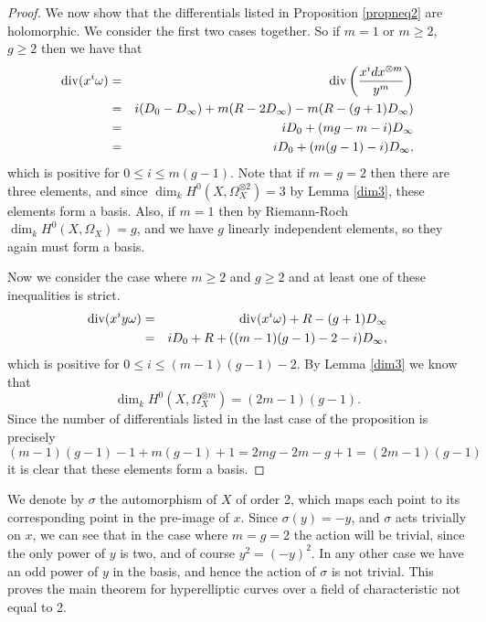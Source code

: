 \begin{proof}
We now show that the differentials listed in Proposition \ref{propneq2} are holomorphic.
We consider the first two cases together.
So if $m=1$ or $m\geq 2$, $g\geq 2$ then we have that
\begin{eqnarray*}
 \operatorname{div}(x^i\omega) & = & \operatorname{div} \left( \frac{x^idx^{\otimes m}}{y^m} \right)\\ & = & i(D_0 -D_\infty) + m(R-2D_\infty) -m(R-(g+1)D_\infty) \\
 & = & iD_0 + (mg -m -i)D_\infty \\
 & = & iD_0 + (m(g-1) -i)D_\infty,
\end{eqnarray*}
which is positive for $0\leq i \leq m(g-1)$.
Note that if $m=g=2$ then there are three elements, and since $\dim_kH^0(X,\Omega_X^{\otimes 2})=3$ by Lemma \ref{dim3}, these elements form a basis.
Also, if $m=1$ then by Riemann-Roch $\dim_k H^0(X,\Omega_X)=g$, and we have $g$ linearly independent elements, so they again must form a basis.

\begin{comment}
If $m=g=2$ then we have that
\begin{eqnarray*}
 \di\left(\frac{x^idx^{\otimes 2}}{y^2}\right) & = & i(D_0-D_\infty) + 2(R-2D_\infty) - 2(R-(g+1)D_\infty) \\
 & = & iD_0+ ((2g-2)-i)D_\infty \\
 & = & iD_0 +(2-i)D_\infty,
\end{eqnarray*}
which is positive for $0\leq 2$.
By Lemma \ref{dim3} then $\dim_kH^0(X,\Omega_X^{\otimes 2})=3$, so again, we have three linearly independent elements, so they must form a basis.
\end{comment}


Now we consider the case where $m\geq 2$ and $g \geq 2$ and at least one of these inequalities is strict.
\begin{eqnarray*}
 \operatorname{div} (x^iy\omega) & = & \operatorname{div}(x^i\omega) + R -(g+1)D_\infty \\
 & = & iD_0 + R +((m-1)(g-1)-2-i)D_\infty,
\end{eqnarray*}
which is positive for $0\leq i \leq (m-1)(g-1)-2$.
By Lemma \ref{dim3} we know that 
\[
\dim_kH^0(X,\Omega_X^{\otimes m}) = (2m-1)(g-1).
\]
Since the number of differentials listed in the last case of the proposition is precisely
\[
 (m-1)(g-1)-1 + m(g-1) +1 = 2mg -2m -g + 1 = (2m-1)(g-1)
\]
it is clear that these elements form a basis.
\end{proof}

We denote by $\sigma$ the automorphism of $X$ of order 2, which maps each point to its corresponding point in the pre-image of $x$.
Since $\sigma(y) = -y$, and $\sigma$ acts trivially on $x$, we can see that in the case where $m=g=2$ the action will be trivial, since the only power of $y$ is two, and of course $y^2 = (-y)^2$.
In any other case we have an odd power of $y$ in the basis, and hence the action of $\sigma$ is not trivial.
This proves the main theorem for hyperelliptic curves over a field of characteristic not equal to 2.




